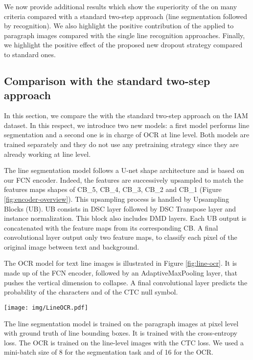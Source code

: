 We now provide additional results which show the superiority of the \modelacc{} on many criteria compared with a standard two-step approach (line segmentation followed by recognition).
We also highlight the positive contribution of the \modelacc{} applied to paragraph images compared with the single line recognition approaches.
Finally, we highlight the positive effect of the proposed new dropout strategy compared to standard ones.

\subsection{Comparison with the standard two-step approach}
In this section, we compare the \modelacc{} with the standard two-step approach on the IAM dataset. In this respect, we introduce two new models: a first model performs line segmentation and a second one is in charge of OCR at line level. Both models are trained separately and they do not use any pretraining strategy since they are already working at line level.

The line segmentation model follows a U-net shape architecture and is based on our FCN encoder. Indeed, the features  are successively upsampled to match the features maps shapes of CB\_5, CB\_4, CB\_3, CB\_2 and CB\_1 (Figure \ref{fig:encoder-overview}). This upsampling process is handled by Upsampling Blocks (UB). UB consists in DSC layer followed by DSC Transpose layer and instance normalization. This block also includes DMD layers. Each UB output is concatenated with the feature maps from its corresponding CB. A final convolutional layer output only two feature maps, to classify each pixel of the original image between text and background.


The OCR model for text line images is illustrated in Figure \ref{fig:line-ocr}. It is made up of the FCN encoder, followed by an AdaptiveMaxPooling layer, that pushes the vertical dimension to collapse. A final convolutional layer predicts the probability of the characters and of the CTC null symbol.

\begin{figure*}[htbp!]
\centering
\texttt{[image: img/LineOCR.pdf]}
        \caption{Text line recognition architecture overview.}
        \label{fig:line-ocr}
\end{figure*}

 The line segmentation model is trained on the paragraph images at pixel level with ground truth of line bounding boxes. It is trained with the cross-entropy loss. The OCR is trained on the line-level images with the CTC loss. We used a mini-batch size of 8 for the segmentation task and of 16 for the OCR.

